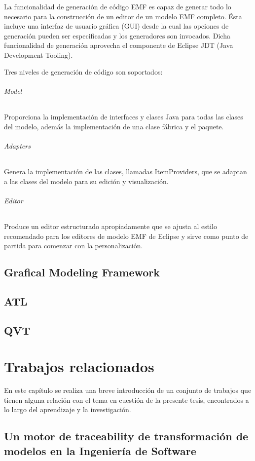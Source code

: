 \documentclass[a4paper,12pt,oneside]{book}
\begin{document}
La funcionalidad de generación de código EMF es capaz de generar todo lo necesario para la construcción de un editor de un modelo EMF completo. Ésta incluye una interfaz de usuario gráfica (GUI) desde la cual las opciones de generación pueden ser especificadas y los generadores son invocados. Dicha funcionalidad de generación aprovecha el componente de Eclipse JDT (Java Development Tooling).

Tres niveles de generación de código son soportados:

\subparagraph{Model} 

Proporciona la implementación de interfaces y clases Java para todas las clases del modelo, además la implementación de una clase fábrica y el paquete.

\subparagraph{Adapters}

Genera la implementación de las clases, llamadas ItemProviders, que se adaptan a las clases del modelo para su edición y visualización.

\subparagraph{Editor}

Produce un editor estructurado apropiadamente que se ajusta al estilo recomendado para los editores de modelo EMF de Eclipse y sirve como punto de partida para comenzar con la personalización.

\section{Grafical Modeling Framework}

\section{ATL}

\section{QVT}


\chapter{Trabajos relacionados}

En este capítulo se realiza una breve introducción de un conjunto de trabajos que tienen alguna relación con el tema en cuestión de la presente tesis, encontrados a lo largo del aprendizaje y la investigación.

\section{Un motor de traceability de transformación de modelos en la Ingeniería de Software}
\end{document}
